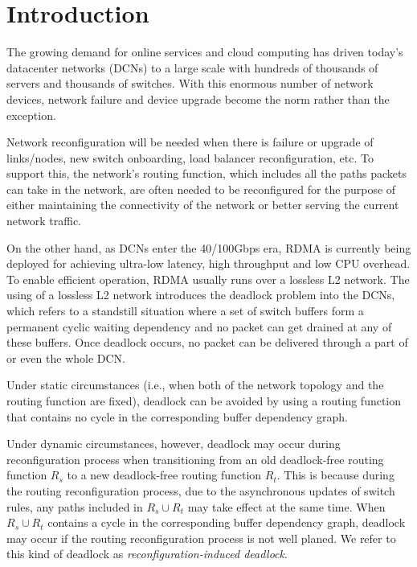 \section{Introduction}\label{sec:intro}

The growing demand for online services and cloud computing has driven today's datacenter networks (DCNs) to a large scale with hundreds of thousands
of servers and thousands of switches. With this enormous number of network devices, network failure and device upgrade become the norm rather than the exception.

Network reconfiguration will be needed when there is  failure or upgrade of links/nodes, new switch onboarding, load balancer reconfiguration, etc. To support this, the network's routing function, which includes all the paths packets can take in the network, are often needed to be reconfigured for the purpose of either maintaining the connectivity of the network or better serving the current network traffic.

On the other hand, as DCNs enter the 40/100Gbps era, RDMA is currently being deployed for achieving ultra-low latency, high throughput and low CPU overhead. To enable efficient operation, RDMA usually runs over a  lossless L2 network. The using of a lossless L2 network introduces the deadlock problem into the DCNs, which refers to a standstill situation where a set of switch buffers form a permanent cyclic waiting dependency and no packet can get drained at any of these buffers. Once deadlock occurs, no packet can be delivered through a part of or even the whole DCN.

Under static circumstances (i.e., when both of the network topology and the routing function are fixed), deadlock can be avoided by using a routing function that contains no cycle in the corresponding buffer dependency graph. 

Under dynamic circumstances, however, deadlock may occur during reconfiguration process when transitioning from an old deadlock-free routing function $R_s$ to a new deadlock-free routing function $R_t$. This is because during the routing reconfiguration process, due to the asynchronous updates of switch rules, any paths included in $R_s \cup R_t$ may take effect at the same time. When $R_s \cup R_t$ contains a cycle in the corresponding buffer dependency graph, deadlock may occur if the routing reconfiguration process is not well planed. We refer to this kind of deadlock as \textit{reconfiguration-induced deadlock}.

